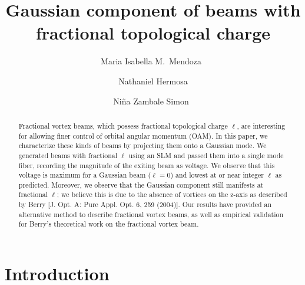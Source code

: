 \documentclass[10pt,a4paper,twoside]{article}
\renewcommand{\l}{\ell}
\begin{document}
\title{\TitleFont Gaussian component of beams with fractional topological charge}

\author[*]{Maria Isabella M.~Mendoza~\authorsep}
\author[ ]{Nathaniel Hermosa \authorsep}
\author[ ]{Ni\~na Zambale Simon~\lastauthorsep}

\begin{abstract}
\noindent
Fractional vortex beams, which possess fractional topological charge $\l$, are interesting for allowing finer control of orbital angular momentum (OAM). In this paper, we characterize these kinds of beams by projecting them onto a Gaussian mode. We generated beams with fractional $\l$ using an SLM and passed them into a single mode fiber, recording the magnitude of the exiting beam as voltage. We observe that this voltage is maximum for a Gaussian beam ($\l=0$) and lowest at or near integer $\l$ as predicted. Moreover, we observe that the Gaussian component still manifests at fractional $\l$; we believe this is due to the absence of vortices on the z-axis as described by Berry [J. Opt. A: Pure Appl. Opt. 6, 259 (2004)]. Our results have provided an alternative method to describe fractional vortex beams, as well as empirical validation for Berry's theoretical work on the fractional vortex beam.



\end{abstract}

\maketitle
\thispagestyle{titlestyle}



\section{Introduction}\label{sec:intro}
\end{document}
